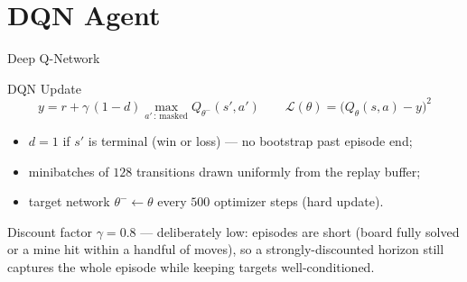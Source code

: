 
\section{DQN Agent}

\begin{frame}{Deep Q-Network \parencite{mnih2015dqn}}
\end{frame}

\begin{frame}{DQN Update}
  \[
    y = r + \gamma \, (1 - d) \max_{a' \,:\, \text{masked}} Q_{\theta^-}(s', a')
    \qquad
    \mathcal{L}(\theta) = \big(Q_\theta(s,a) - y\big)^2
  \]
  \begin{itemize}
    \item $d = 1$ if $s'$ is terminal (win or loss) — no bootstrap past
      episode end;
    \item minibatches of $128$ transitions drawn uniformly from the replay
      buffer;
    \item target network $\theta^- \gets \theta$ every $500$ optimizer
      steps (hard update).
  \end{itemize}
  \begin{highlightbox}{Discount factor}
    $\gamma = 0.8$ — deliberately low: episodes are short
    (board fully solved or a mine hit within a handful of moves), so
    a strongly-discounted horizon still captures the whole episode
    while keeping targets well-conditioned.
  \end{highlightbox}
\end{frame}


